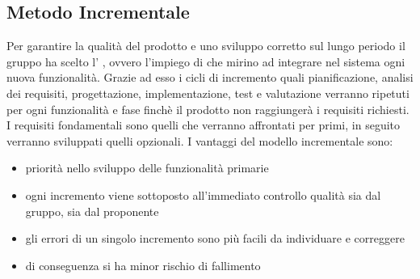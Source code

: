 \documentclass[../piano_di_progetto.tex]{subfiles}
\begin{document}
\subsection{Metodo Incrementale}
\label{sub:incr}
Per garantire la qualità del prodotto e uno sviluppo corretto sul lungo periodo il gruppo ha scelto l’ , ovvero l'impiego di  che mirino ad integrare nel sistema ogni nuova funzionalità. Grazie ad esso i cicli di incremento quali pianificazione, analisi dei requisiti, progettazione, implementazione, test e valutazione verranno ripetuti per ogni funzionalità e fase finchè il prodotto non raggiungerà i requisiti richiesti. I requisiti fondamentali sono quelli che verranno affrontati per primi, in seguito verranno sviluppati quelli opzionali.
I vantaggi del modello incrementale sono:
\begin{itemize}
\item priorità nello sviluppo delle funzionalità primarie
\item ogni incremento viene sottoposto all’immediato controllo qualità sia dal gruppo, sia dal proponente
\item gli errori di un singolo incremento sono più facili da individuare e correggere
\item di conseguenza si ha minor rischio di fallimento
\end{itemize}
\end{document}
